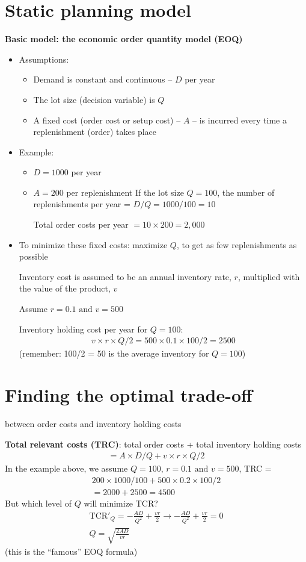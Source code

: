 \documentclass[10pt]{article}
\begin{document}
\section{Static planning model}
\textbf{Basic model: the economic order quantity model (EOQ)}
\begin{itemize}
    \item Assumptions: 
    \begin{itemize}
        \item Demand is constant and continuous -- $D$ per year 
        \item The lot size (decision variable) is $Q $
        \item A fixed cost (order cost or setup cost) -- $A $ -- is incurred every time a replenishment (order) takes place 
    \end{itemize}
    \item Example: 
    \begin{itemize}
        \item $D = 1000 $ per year 
        \item $A = 200 $ per replenishment
        If the lot size $Q = 100 $, the number of replenishments per year = $D / Q = 1000 / 100 = 10$

        Total order costs per year $ = 10\times 200 = 2,000 $
    \end{itemize}
    \item To minimize these fixed costs: maximize $Q $, to get as few replenishments as possible 
    
Inventory cost is assumed to be an annual inventory rate, $r $, multiplied with the value of the product, $v $

Assume $r = 0.1 \text{ and } v  = 500 $

Inventory holding cost per year for $Q = 100 $: 
\begin{gather*}
    v\times r\times Q / 2 = 500\times 0.1\times 100/2 = 2500 
\end{gather*}
(remember: 100/2 = 50 is the average inventory for $Q = 100 $)
\end{itemize}
\newpage 
\section{Finding the optimal trade-off}
between order costs and inventory holding costs 

\textbf{Total relevant costs (TRC)}: total order costs + total inventory holding costs 
\begin{gather*}
    = A\times D/Q + v\times r\times Q/2 
\end{gather*}
In the example above, we assume $Q = 100,\, r = 0.1 \text{ and } v  = 500 $, TRC = 
\begin{gather*}
    200\times 1000 / 100 + 500\times 0.2\times 100/2\\
    = 2000 + 2500 = 4500
\end{gather*}
But which level of $Q $ will minimize TCR?
\begin{gather*}
    \text{TCR}'_Q = -\frac{AD}{Q^2} + \frac{vr}{2} \to -\frac{AD}{Q^2} + \frac{vr}{2} = 0\\
    Q = \sqrt{\frac{2AD}{vr}}
\end{gather*}
(this is the ``famous'' EOQ formula)
\end{document}
